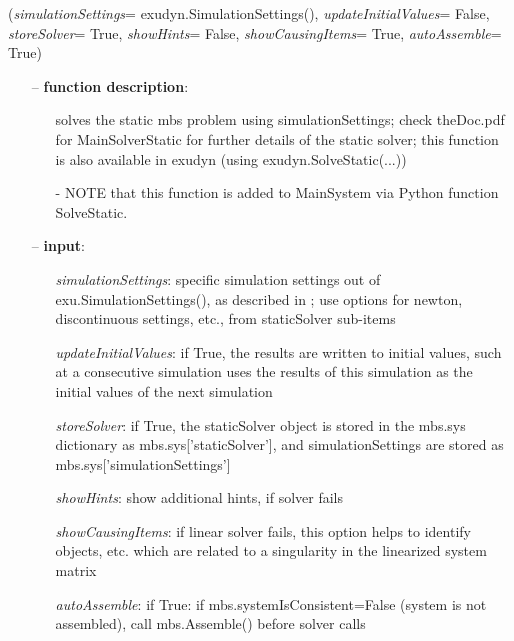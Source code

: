 %
\begin{flushleft}
\label{sec:mainsystemextensions:SolveStatic}
({\it simulationSettings}= exudyn.SimulationSettings(), {\it updateInitialValues}= False, {\it storeSolver}= True, {\it showHints}= False, {\it showCausingItems}= True, {\it autoAssemble}= True)
\end{flushleft}
\setlength{\itemindent}{0.7cm}
\begin{itemize}[leftmargin=0.7cm]
\item[--]
{\bf function description}: \vspace{-6pt}
\begin{itemize}[leftmargin=1.2cm]
\setlength{\itemindent}{-0.7cm}
\item[]solves the static mbs problem using simulationSettings; check theDoc.pdf for MainSolverStatic for further details of the static solver; this function is also available in exudyn (using exudyn.SolveStatic(...))
\item[]- NOTE that this function is added to MainSystem via Python function SolveStatic.
\end{itemize}
\item[--]
{\bf input}: \vspace{-6pt}
\begin{itemize}[leftmargin=1.2cm]
\setlength{\itemindent}{-0.7cm}
\item[]{\it simulationSettings}: specific simulation settings out of exu.SimulationSettings(), as described in ; use options for newton, discontinuous settings, etc., from staticSolver sub-items
\item[]{\it updateInitialValues}: if True, the results are written to initial values, such at a consecutive simulation uses the results of this simulation as the initial values of the next simulation
\item[]{\it storeSolver}: if True, the staticSolver object is stored in the mbs.sys dictionary as mbs.sys['staticSolver'], and simulationSettings are stored as mbs.sys['simulationSettings']
\item[]{\it showHints}: show additional hints, if solver fails
\item[]{\it showCausingItems}: if linear solver fails, this option helps to identify objects, etc. which are related to a singularity in the linearized system matrix
\item[]{\it autoAssemble}: if True: if mbs.systemIsConsistent=False (system is not assembled), call mbs.Assemble() before solver calls

\end{itemize}
\end{itemize}
